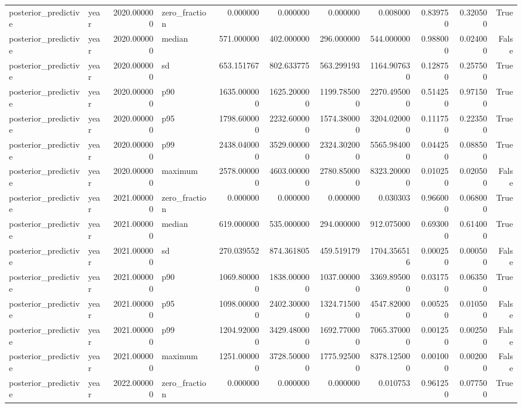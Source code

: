 \begin{tabular}{llrlrrrrrrr}
posterior\_predictive & year & 2020.000000 & zero\_fraction & 0.000000 & 0.000000 & 0.000000 & 0.008000 & 0.839750 & 0.320500 & True \\
posterior\_predictive & year & 2020.000000 & median & 571.000000 & 402.000000 & 296.000000 & 544.000000 & 0.988000 & 0.024000 & False \\
posterior\_predictive & year & 2020.000000 & sd & 653.151767 & 802.633775 & 563.299193 & 1164.907630 & 0.128750 & 0.257500 & True \\
posterior\_predictive & year & 2020.000000 & p90 & 1635.000000 & 1625.200000 & 1199.785000 & 2270.495000 & 0.514250 & 0.971500 & True \\
posterior\_predictive & year & 2020.000000 & p95 & 1798.600000 & 2232.600000 & 1574.380000 & 3204.020000 & 0.111750 & 0.223500 & True \\
posterior\_predictive & year & 2020.000000 & p99 & 2438.040000 & 3529.000000 & 2324.302000 & 5565.984000 & 0.044250 & 0.088500 & True \\
posterior\_predictive & year & 2020.000000 & maximum & 2578.000000 & 4603.000000 & 2780.850000 & 8323.200000 & 0.010250 & 0.020500 & False \\
posterior\_predictive & year & 2021.000000 & zero\_fraction & 0.000000 & 0.000000 & 0.000000 & 0.030303 & 0.966000 & 0.068000 & True \\
posterior\_predictive & year & 2021.000000 & median & 619.000000 & 535.000000 & 294.000000 & 912.075000 & 0.693000 & 0.614000 & True \\
posterior\_predictive & year & 2021.000000 & sd & 270.039552 & 874.361805 & 459.519179 & 1704.356516 & 0.000250 & 0.000500 & False \\
posterior\_predictive & year & 2021.000000 & p90 & 1069.800000 & 1838.000000 & 1037.000000 & 3369.895000 & 0.031750 & 0.063500 & True \\
posterior\_predictive & year & 2021.000000 & p95 & 1098.000000 & 2402.300000 & 1324.715000 & 4547.820000 & 0.005250 & 0.010500 & False \\
posterior\_predictive & year & 2021.000000 & p99 & 1204.920000 & 3429.480000 & 1692.770000 & 7065.370000 & 0.001250 & 0.002500 & False \\
posterior\_predictive & year & 2021.000000 & maximum & 1251.000000 & 3728.500000 & 1775.925000 & 8378.125000 & 0.001000 & 0.002000 & False \\
posterior\_predictive & year & 2022.000000 & zero\_fraction & 0.000000 & 0.000000 & 0.000000 & 0.010753 & 0.961250 & 0.077500 & True \\

\end{tabular}
